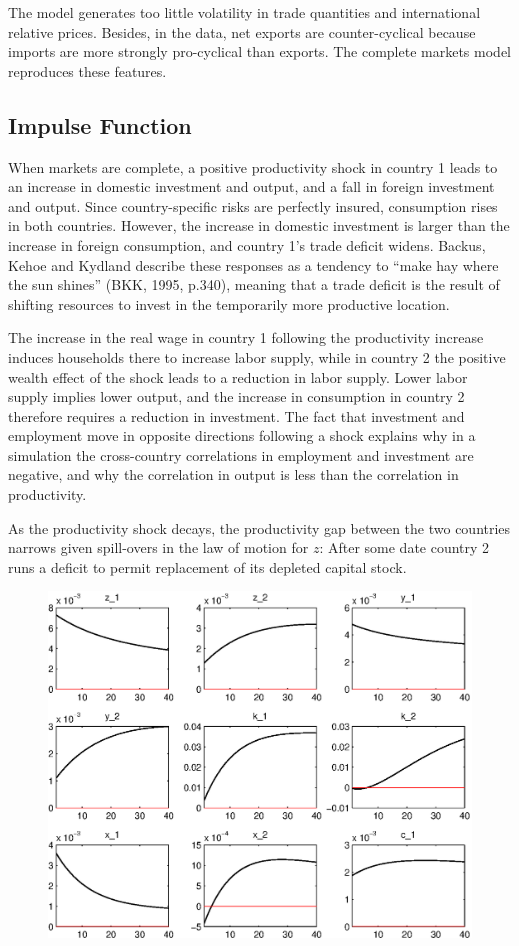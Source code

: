 \documentclass[11pt,a4paper]{article}
\begin{document}
The model generates too little volatility in trade quantities and international
relative prices. Besides, in the data, net exports are counter-cyclical because imports are more strongly pro-cyclical than exports. The complete markets model reproduces these features.
\subsection{Impulse Function}
When markets are complete, a positive productivity shock
in country 1 leads to an increase in domestic investment and output, and a fall in
foreign investment and output. Since country-specific risks are perfectly insured,
consumption rises in both countries. However, the increase in domestic investment is
larger than the increase in foreign consumption, and country 1's trade deficit widens.
Backus, Kehoe and Kydland describe these responses as a tendency to ``make hay
where the sun shines'' (BKK, 1995, p.340), meaning that a trade deficit is the result
of shifting resources to invest in the temporarily more productive location.

The increase in the real wage in country 1 following the productivity increase
induces households there to increase labor supply, while in country 2 the positive
wealth effect of the shock leads to a reduction in labor supply. Lower labor supply
implies lower output, and the increase in consumption in country 2 therefore requires
a reduction in investment. The fact that investment and employment move in
opposite directions following a shock explains why in a simulation the cross-country
correlations in employment and investment are negative, and why the correlation in
output is less than the correlation in productivity.

As the productivity shock decays, the productivity gap between the two countries
narrows given spill-overs in the law of motion for $z$: After some date country 2 runs a
deficit to permit replacement of its depleted capital stock.
\begin{figure}[H]
\begin{center}
\includegraphics[scale=0.8]{dsge2_IRF_eps_11.eps} 
\label{gdp_filter}
\end{center}
\end{figure}
\end{document}
